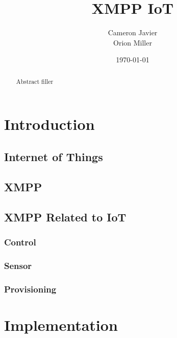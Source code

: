 \documentclass{sig-alternate}
\begin{document}
\title{XMPP IoT}
\author{Cameron Javier\\
        Orion Miller}
\date{\today}
\maketitle

\begin{abstract}
Abstract filler
\end{abstract}




\section{Introduction}



\subsection{Internet of Things}

\subsection{XMPP}



\subsection{XMPP Related to IoT}



\subsubsection{Control}



\subsubsection{Sensor}

\subsubsection{Provisioning}

\section{Implementation}
\end{document}
